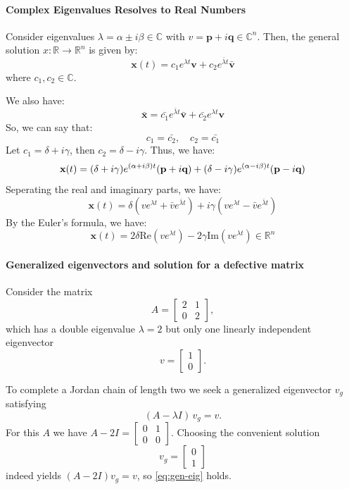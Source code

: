 \documentclass[11pt]{article}
\begin{document}
\paragraph{Complex Eigenvalues Resolves to Real Numbers} Consider eigenvalues $\lambda = \alpha \pm i\beta \in \mathbb{C}$ with $v = \textbf{p} + i\textbf{q}\in \mathbb{C}^n$. Then, the general solution $x: \mathbb{R} \to \mathbb{R}^n$ is given by:
\begin{equation}
\textbf{x}(t) = c_1 e^{\lambda t} \textbf{v} + c_2 e^{\bar{\lambda} t} \bar{\textbf{v}}
\end{equation}
where $c_1, c_2 \in \mathbb{C}$.

We also have:
$$
    \bar{\textbf{x}} = \bar{c_1} e^{\bar{\lambda} t} \bar{\textbf{v}} + \bar{c_2} e^{\lambda t} \textbf{v}
$$
So, we can say that:
$$
c_1 = \bar{c_2}, \quad c_2 = \bar{c_1}
$$
Let $c_1 =  \delta + i\gamma$, then $c_2 = \delta - i\gamma$. Thus, we have:
\begin{equation}
\textbf{x}(t) = (\delta + i\gamma)e^{(\alpha + i\beta)t}(\textbf{p} + i\textbf{q}) + (\delta - i\gamma)e^{(\alpha - i\beta)t}(\textbf{p} - i\textbf{q}) \\
\end{equation}
Seperating the real and imaginary parts, we have:
\begin{equation}
\textbf{x}(t) = \delta (ve^{\lambda t} + \bar{v}e^{\bar{\lambda} t}) + i\gamma (ve^{\lambda t} - \bar{v}e^{\bar{\lambda} t})
\end{equation}
By the Euler's formula, we have:
\begin{equation}
\textbf{x}(t) = 2\delta \mathrm{Re}(ve^{\lambda t}) - 2\gamma \mathrm{Im}(ve^{\lambda t}) \in \mathbb{R}^n
\end{equation}

\paragraph{Generalized eigenvectors and solution for a defective matrix}
Consider the matrix
\[
A=\begin{bmatrix}2 & 1\\[4pt]0 & 2\end{bmatrix},
\]
which has a double eigenvalue \(\lambda=2\) but only one linearly independent eigenvector
\[
v=\begin{bmatrix}1\\[4pt]0\end{bmatrix}.
\]

To complete a Jordan chain of length two we seek a generalized eigenvector \(v_g\) satisfying
\begin{equation}
(A-\lambda I)\,v_g = v. \label{eq:gen-eig}
\end{equation}
For this \(A\) we have \(A-2I=\begin{bmatrix}0&1\\0&0\end{bmatrix}\). Choosing the convenient solution
\[
v_g=\begin{bmatrix}0\\[4pt]1\end{bmatrix}
\]
indeed yields \((A-2I)v_g=v\), so \eqref{eq:gen-eig} holds.
\end{document}
